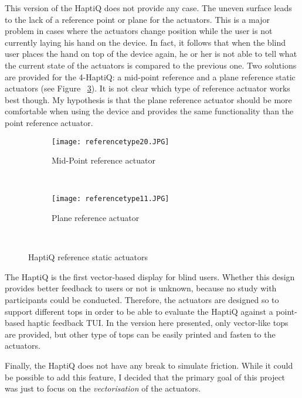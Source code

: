This version of the HaptiQ does not provide any case. The uneven surface leads to the lack of a reference point or plane for the actuators. This is a major problem in cases where the actuators change position while the user is not currently laying his hand on the device. In fact, it follows that when the blind user places the hand on top of the device again, he or her is not able to tell what the current state of the actuators is compared to the previous one. Two solutions are provided for the 4-HaptiQ: a mid-point reference and a plane reference static actuators (see Figure ~\ref{fig:HaptiQ reference static actuators}). It is not clear which type of reference actuator works best though. My hypothesis is that the plane reference actuator should be more comfortable when using the device and provides the same functionality than the point reference actuator. 

\begin{figure}
        \centering
        \begin{subfigure}[H]{0.5\textwidth}
                \texttt{[image: referencetype20.JPG]}
                \caption{Mid-Point reference actuator}
                \label{fig:Mid-Point reference actuator}
        \end{subfigure}%
        ~ %
        \begin{subfigure}[H]{0.5\textwidth}
                \texttt{[image: referencetype11.JPG]}
                \caption{Plane reference actuator}
                \label{fig:Plane reference actuator}
        \end{subfigure}
        ~ %
        \caption{HaptiQ reference static actuators}\label{fig:HaptiQ reference static actuators}
\end{figure}

The HaptiQ is the first vector-based display for blind users. Whether this design provides better feedback to users or not is unknown, because no study with participants could be conducted. Therefore, the actuators are designed so to support different tops in order to be able to evaluate the HaptiQ against a point-based haptic feedback TUI. In the version here presented, only vector-like tops are provided, but other type of tops can be easily printed and fasten to the actuators.   

Finally, the HaptiQ does not have any break to simulate friction. While it could be possible to add this feature, I decided that the primary goal of this project was just to focus on the \textit{vectorisation} of the actuators. 

